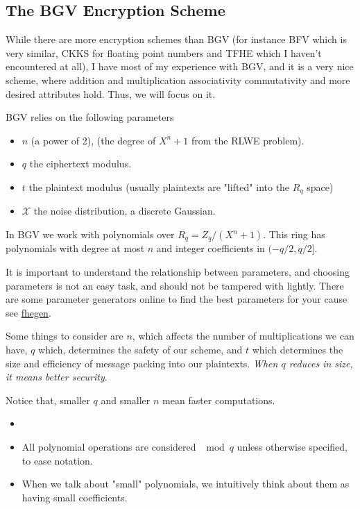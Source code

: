 \subsection{The BGV Encryption Scheme}

While there are more encryption schemes than BGV (for instance BFV which is very similar,
 CKKS for floating point numbers and TFHE which I haven't encountered at all),
I have most of my experience with BGV, and it is a very nice scheme, 
where addition and multiplication associativity commutativity and more desired attributes 
hold.  Thus, we will focus on it.


BGV relies on the following parameters
\begin{itemize}
    \item $n$ (a power of 2), (the degree of $X^n+1$ from the RLWE problem).
    \item $q$ the ciphertext modulus.
    \item $t$ the plaintext modulus (usually plaintexts are "lifted" into the $R_q$ space)
    \item $\mathcal{X}$ the noise distribution, a discrete Gaussian.
\end{itemize}

In BGV we work with polynomials over $R_q=Z_q/(X^n+1)$.
This ring has polynomials with degree at most $n$ and integer coefficients in $(-q/2,q/2]$.

\begin{remark}
    It is important to understand the relationship between parameters, and choosing parameters 
    is not an easy task, and should not be tampered with lightly.
    There are some parameter generators online to find the best parameters
     for your cause see \href{https://github.com/Crypto-TII/fhegen}{fhegen}.
    
    Some things to consider are $n$, which affects the number of multiplications we can have,
    $q$ which, determines the safety of our scheme, and $t$ which determines 
    the size and efficiency of message packing into our plaintexts. 
    \emph{When $q$ reduces in size, it means better security}.    

    Notice that, smaller $q$ and smaller $n$ mean faster computations.
\end{remark}


\begin{remark}
    \begin{itemize}
        \item \red{check: I think we can treat coefficients as they were in $(0,q]$.}
        \item All polynomial operations are considered $\mod q$
         unless otherwise specified, to ease notation.
         \item When we talk about "small" polynomials, 
         we intuitively think about them as having small coefficients.
    \end{itemize}
\end{remark}

